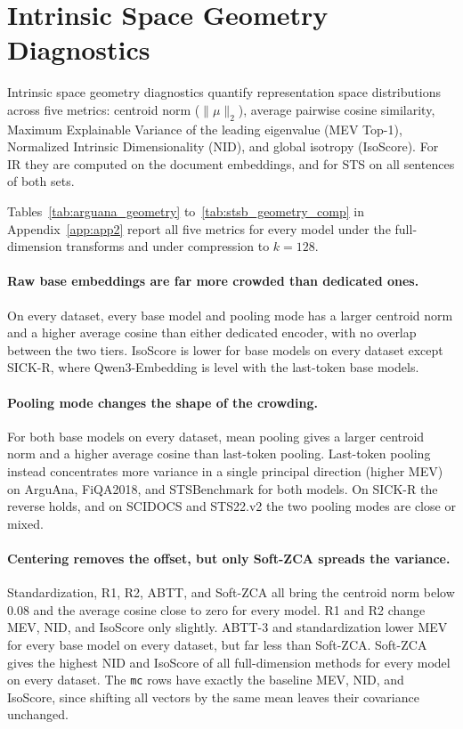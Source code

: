 \section{Intrinsic Space Geometry Diagnostics}
\label{sec:geometry_results}

Intrinsic space geometry diagnostics quantify representation space distributions across five metrics: centroid norm ($\|\mu\|_2$), average pairwise cosine similarity, Maximum Explainable Variance of the leading eigenvalue (MEV Top-1), Normalized Intrinsic Dimensionality (NID), and global isotropy (IsoScore). For IR they are computed on the document embeddings, and for STS on all sentences of both sets.

Tables~\ref{tab:arguana_geometry} to~\ref{tab:stsb_geometry_comp} in Appendix~\ref{app:app2} report all five metrics for every model under the full-dimension transforms and under compression to $k=128$.

\paragraph{Raw base embeddings are far more crowded than dedicated ones.}
On every dataset, every base model and pooling mode has a larger centroid norm and a higher average cosine than either dedicated encoder, with no overlap between the two tiers. IsoScore is lower for base models on every dataset except SICK-R, where Qwen3-Embedding is level with the last-token base models.

\paragraph{Pooling mode changes the shape of the crowding.}
For both base models on every dataset, mean pooling gives a larger centroid norm and a higher average cosine than last-token pooling. Last-token pooling instead concentrates more variance in a single principal direction (higher MEV) on ArguAna, FiQA2018, and STSBenchmark for both models. On SICK-R the reverse holds, and on SCIDOCS and STS22.v2 the two pooling modes are close or mixed.

\paragraph{Centering removes the offset, but only Soft-ZCA spreads the variance.}
Standardization, R1, R2, ABTT, and Soft-ZCA all bring the centroid norm below 0.08 and the average cosine close to zero for every model. R1 and R2 change MEV, NID, and IsoScore only slightly. ABTT-3 and standardization lower MEV for every base model on every dataset, but far less than Soft-ZCA. Soft-ZCA gives the highest NID and IsoScore of all full-dimension methods for every model on every dataset. The \texttt{mc} rows have exactly the baseline MEV, NID, and IsoScore, since shifting all vectors by the same mean leaves their covariance unchanged.


